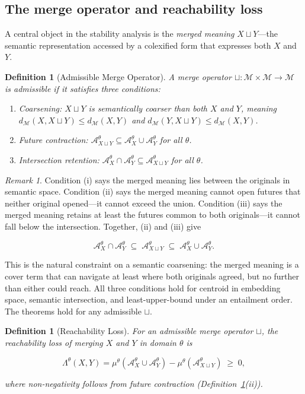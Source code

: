 \documentclass[12pt]{article}
\theoremstyle{rthm}
\theoremstyle{rdef}
\newtheorem{definition}[theorem]{Definition}
\theoremstyle{remark}
\newtheorem*{remark}{Remark}
\newcommand{\M}{\mathcal{M}}
\newcommand{\A}{\mathcal{A}}
\newcommand{\Lam}[1][\theta]{\Lambda^{#1}}
\newcommand{\dM}{d_{\mathcal{M}}}
\begin{document}
\subsection{The merge operator and reachability loss}

A central object in the stability analysis is the \emph{merged meaning}
$X \sqcup Y$---the semantic representation accessed by a colexified form that
expresses both $X$ and $Y$.

\begin{definition}[Admissible Merge Operator]
\label{def:merge}
A \emph{merge operator} $\sqcup : \M \times \M \to \M$ is \emph{admissible}
if it satisfies three conditions:
\begin{enumerate}[nosep,label=(\roman*)]
  \item \emph{Coarsening}: $X \sqcup Y$ is semantically coarser than both $X$
        and $Y$, meaning $\dM(X, X \sqcup Y) \leq \dM(X, Y)$ and
        $\dM(Y, X \sqcup Y) \leq \dM(X,Y)$.
  \item \emph{Future contraction}: $\A_{X \sqcup Y}^{\theta} \subseteq
        \A_X^{\theta} \cup \A_Y^{\theta}$ for all $\theta$.
  \item \emph{Intersection retention}: $\A_X^{\theta} \cap \A_Y^{\theta}
        \subseteq \A_{X \sqcup Y}^{\theta}$ for all $\theta$.
\end{enumerate}
\end{definition}

\begin{remark}
Condition (i) says the merged meaning lies between the originals in semantic
space. Condition (ii) says the merged meaning cannot open futures that neither
original opened---it cannot exceed the union. Condition (iii) says the merged
meaning retains at least the futures common to both originals---it cannot fall
below the intersection. Together, (ii) and (iii) give

\[
\A_X^{\theta} \cap \A_Y^{\theta}
\;\subseteq\;
\A_{X \sqcup Y}^{\theta}
\;\subseteq\;
\A_X^{\theta} \cup \A_Y^{\theta}.
\]

This is the natural constraint on a semantic coarsening: the merged meaning is
a cover term that can navigate at least where both originals agreed, but no
further than either could reach. All three conditions hold for centroid in
embedding space, semantic intersection, and least-upper-bound under an
entailment order. The theorems hold for any admissible $\sqcup$.
\end{remark}

\begin{definition}[Reachability Loss]
\label{def:lam}
For an admissible merge operator $\sqcup$, the \emph{reachability loss} of
merging $X$ and $Y$ in domain $\theta$ is

\[
\Lam(X,Y) = \mu^{\theta}\!\left(\A_X^{\theta} \cup \A_Y^{\theta}\right)
            - \mu^{\theta}\!\left(\A_{X \sqcup Y}^{\theta}\right) \;\geq\; 0,
\]

where non-negativity follows from future contraction (Definition~\ref{def:merge}(ii)).
\end{definition}
\end{document}
